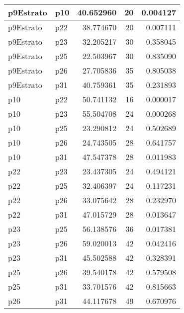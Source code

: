 \begin{table}
\begin{tabular}[t]{l|l|r|r|r}
\hline
p9Estrato & p10 & 40.652960 & 20 & 0.004127\\
\hline
p9Estrato & p22 & 38.774670 & 20 & 0.007111\\
\hline
p9Estrato & p23 & 32.205217 & 30 & 0.358045\\
\hline
p9Estrato & p25 & 22.503967 & 30 & 0.835090\\
\hline
p9Estrato & p26 & 27.705836 & 35 & 0.805038\\
\hline
p9Estrato & p31 & 40.759361 & 35 & 0.231893\\
\hline
p10 & p22 & 50.741132 & 16 & 0.000017\\
\hline
p10 & p23 & 55.504708 & 24 & 0.000268\\
\hline
p10 & p25 & 23.290812 & 24 & 0.502689\\
\hline
p10 & p26 & 24.743505 & 28 & 0.641757\\
\hline
p10 & p31 & 47.547378 & 28 & 0.011983\\
\hline
p22 & p23 & 23.437305 & 24 & 0.494121\\
\hline
p22 & p25 & 32.406397 & 24 & 0.117231\\
\hline
p22 & p26 & 33.075642 & 28 & 0.232970\\
\hline
p22 & p31 & 47.015729 & 28 & 0.013647\\
\hline
p23 & p25 & 56.138576 & 36 & 0.017381\\
\hline
p23 & p26 & 59.020013 & 42 & 0.042416\\
\hline
p23 & p31 & 45.502588 & 42 & 0.328391\\
\hline
p25 & p26 & 39.540178 & 42 & 0.579508\\
\hline
p25 & p31 & 33.701576 & 42 & 0.815663\\
\hline
p26 & p31 & 44.117678 & 49 & 0.670976\\
\hline
\end{tabular}
\end{table}
